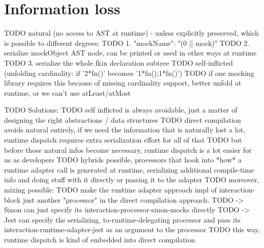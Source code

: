 \section{Information loss}
TODO natural (no access to AST at runtime) - unless explicitly preserved, which is possible to different degrees:
TODO    1. "mockName": "(0 || mock)"
TODO    2. serialize mockObject AST node, can be printed or used in other ways at runtime
TODO    3. serialize the whole fkin declaration subtree
TODO self-inflicted (unfolding cardinality: if '2*fn()' becomes '1*fn();1*fn()')
TODO    if one mocking library requires this because of missing cardinality support, better unfold at runtime, or we can't use atLeast/atMost

TODO Solutions:
TODO self inflicted is always avoidable, just a matter of designing the right abstractions / data structures
TODO direct compilation avoids natural entirely, if we need the information that is naturally lost a lot, runtime dispatch requires extra serialization effort for all of that
TODO but before those natural infos become necessary, runtime dispatch is a lot easier for us as developers
TODO hybrids possible, processors that hook into *how* a runtime adapter call is generated at runtime, serializing additional compile-time info and doing stuff with it directly or passing it to the adapter
TODO moreover, mixing possible:
TODO    make the runtime adapter approach impl of interaction-block just another "processor" in the direct compilation approach.
TODO    -> Sinon can just specify its interaction-processor-sinon-mocks directly
TODO    -> Jest can specify the serializing, to-runtime-delegating processor and pass its interaction-runtime-adapter-jest as an argument to the processor
TODO    this way, runtime dispatch is kind of embedded into direct compilation
